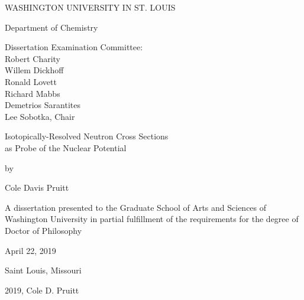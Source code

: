 \begin{titlepage}
\begin{singlespace}
  \begin{center}
        \vspace*{1cm}
        
        WASHINGTON UNIVERSITY IN ST. LOUIS
        
        \vspace{0.5cm}
        Department of Chemistry
        
        \vspace{1.5cm}

        Dissertation Examination Committee:\\
        Robert Charity\\
        Willem Dickhoff\\ 
        Ronald Lovett\\
        Richard Mabbs\\
        Demetrios Sarantites\\
        Lee Sobotka, Chair\\
    
        \vspace{1.5 cm}

        Isotopically-Resolved Neutron Cross Sections\\
        as Probe of the Nuclear Potential

        \vspace{0.5 cm}

        by

        \vspace{0.5 cm}
        
        Cole Davis Pruitt
        
        \vfill
        
        A dissertation presented to the Graduate School of Arts and Sciences of Washington University in partial fulfillment of the requirements for the degree of Doctor of Philosophy
        
        \vspace{0.8cm}
        
        April 22, 2019
        
        \vspace{0.5 cm}
        Saint Louis, Missouri
        
      \end{center}
      \end{singlespace}
    \end{titlepage}
    
    \clearpage
    
    \vspace*{\fill}
    \begin{center}    
      \textcopyright \hspace{2pt} 2019, Cole D. Pruitt
    \end{center}
    \vspace*{\fill}
    
    \thispagestyle{empty} %
    \addtocounter{page}{-1}%
    \clearpage
